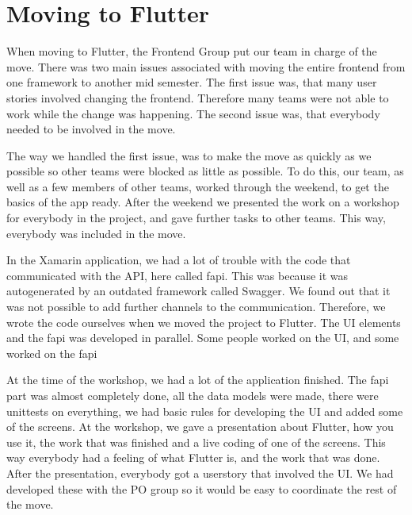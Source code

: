\section{Moving to Flutter}
When moving to Flutter, the Frontend Group put our team in charge of the move. 
There was two main issues associated with moving the entire frontend from one framework to another mid semester.
The first issue was, that many user stories involved changing the frontend. Therefore many teams were not able to work while the change was happening.
The second issue was, that everybody needed to be involved in the move. 

The way we handled the first issue, was to make the move as quickly as we possible so other teams were blocked as little as possible.
To do this, our team, as well as a few members of other teams, worked through the weekend, to get the basics of the app ready. After the weekend we presented the work on a workshop for everybody in the project, and gave further tasks to other teams.
This way, everybody was included in the move. 

In the Xamarin application, we had a lot of trouble with the code that communicated with the API, here called \gls{fapi}. This was because it was autogenerated by an outdated framework called Swagger. We found out that it was not possible to add further channels to the communication. Therefore, we wrote the code ourselves when we moved the project to Flutter. The UI elements and the \gls{fapi} was developed in parallel. Some people worked on the UI, and some worked on the \gls{fapi}

At the time of the workshop, we had a lot of the application finished. The \gls{fapi} part was almost completely done, all the data models were made, there were unittests on everything, we had basic rules for developing the UI and added some of the screens. 
At the workshop, we gave a presentation about Flutter, how you use it, the work that was finished and a live coding of one of the screens. This way everybody had a feeling of what Flutter is, and the work that was done. 
After the presentation, everybody got a userstory that involved the UI. We had developed these with the \gls{PO} group so it would be easy to coordinate the rest of the move.  
